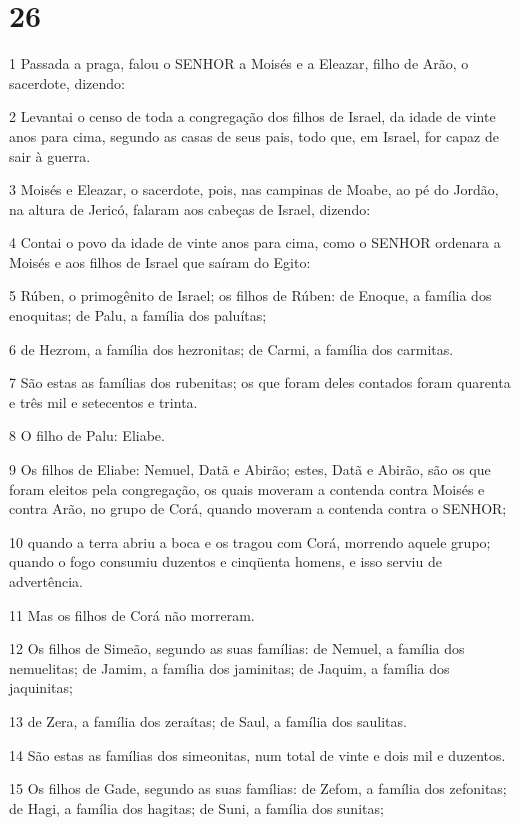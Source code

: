 \chapter{26}

\par 1 Passada a praga, falou o SENHOR a Moisés e a Eleazar, filho de Arão, o sacerdote, dizendo:
\par 2 Levantai o censo de toda a congregação dos filhos de Israel, da idade de vinte anos para cima, segundo as casas de seus pais, todo que, em Israel, for capaz de sair à guerra.
\par 3 Moisés e Eleazar, o sacerdote, pois, nas campinas de Moabe, ao pé do Jordão, na altura de Jericó, falaram aos cabeças de Israel, dizendo:
\par 4 Contai o povo da idade de vinte anos para cima, como o SENHOR ordenara a Moisés e aos filhos de Israel que saíram do Egito:
\par 5 Rúben, o primogênito de Israel; os filhos de Rúben: de Enoque, a família dos enoquitas; de Palu, a família dos paluítas;
\par 6 de Hezrom, a família dos hezronitas; de Carmi, a família dos carmitas.
\par 7 São estas as famílias dos rubenitas; os que foram deles contados foram quarenta e três mil e setecentos e trinta.
\par 8 O filho de Palu: Eliabe.
\par 9 Os filhos de Eliabe: Nemuel, Datã e Abirão; estes, Datã e Abirão, são os que foram eleitos pela congregação, os quais moveram a contenda contra Moisés e contra Arão, no grupo de Corá, quando moveram a contenda contra o SENHOR;
\par 10 quando a terra abriu a boca e os tragou com Corá, morrendo aquele grupo; quando o fogo consumiu duzentos e cinqüenta homens, e isso serviu de advertência.
\par 11 Mas os filhos de Corá não morreram.
\par 12 Os filhos de Simeão, segundo as suas famílias: de Nemuel, a família dos nemuelitas; de Jamim, a família dos jaminitas; de Jaquim, a família dos jaquinitas;
\par 13 de Zera, a família dos zeraítas; de Saul, a família dos saulitas.
\par 14 São estas as famílias dos simeonitas, num total de vinte e dois mil e duzentos.
\par 15 Os filhos de Gade, segundo as suas famílias: de Zefom, a família dos zefonitas; de Hagi, a família dos hagitas; de Suni, a família dos sunitas;
